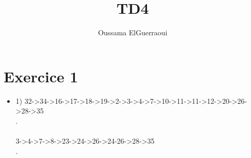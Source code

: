 \documentclass[frenchb]{article}
\begin{document}
\title{\vspace{4cm} {TD4}}
\author{ Oussama ElGuerraoui}
 


\section{Exercice 1}
\begin{itemize}
 \item 1) 
32->34->16->17->18->19->2->3->4->7->10->11->11->12->20->26->28->35 
\\
[(<un>)F]. \\
\\3->4->7->8->23->24->26->24-26->28->35\\
[(<IF]. \\
\\




\end{itemize}
\end{document}
